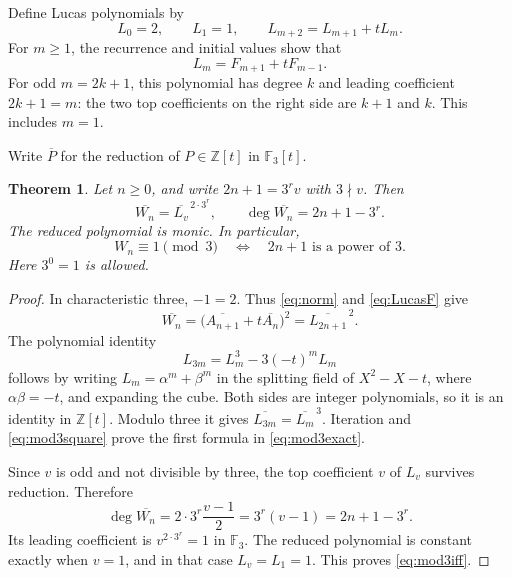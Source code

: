 \documentclass[11pt]{article}
\numberwithin{equation}{section}
\newtheorem{theorem}{Theorem}[section]
\theoremstyle{definition}
\newcommand{\Z}{\mathbb Z}
\newcommand{\F}{\mathbb F}
\begin{document}
Define Lucas polynomials by
\[
 L_0=2,\qquad L_1=1,\qquad L_{m+2}=L_{m+1}+tL_m.
\]
For $m\geq1$, the recurrence and initial values show that
\begin{equation}\label{eq:LucasF}
 L_m=F_{m+1}+tF_{m-1}.
\end{equation}
For odd $m=2k+1$, this polynomial has degree $k$ and leading coefficient
$2k+1=m$: the two top coefficients on the right side are $k+1$ and $k$.
This includes $m=1$.

Write $\overline P$ for the reduction of $P\in\Z[t]$ in $\F_3[t]$.

\begin{theorem}\label{thm:mod3}
Let $n\geq0$, and write $2n+1=3^r v$ with $3\nmid v$.
Then
\begin{equation}\label{eq:mod3exact}
 \overline{W_n}=\overline{L_v}^{\,2\cdot3^r},\qquad
 \deg\overline{W_n}=2n+1-3^r.
\end{equation}
The reduced polynomial is monic.  In particular,
\begin{equation}\label{eq:mod3iff}
 \boxed{\quad W_n\equiv1\pmod3
 \quad\Longleftrightarrow\quad
 2n+1\text{ is a power of }3.\quad}
\end{equation}
Here $3^0=1$ is allowed.
\end{theorem}
\begin{proof}
In characteristic three, $-1=2$.  Thus \eqref{eq:norm} and
\eqref{eq:LucasF} give
\begin{equation}\label{eq:mod3square}
 \overline{W_n}
 =\bigl(\overline{A_{n+1}}+t\overline{A_n}\bigr)^2
 =\overline{L_{2n+1}}^{\,2}.
\end{equation}
The polynomial identity
\begin{equation}\label{eq:LucasFrobenius}
 L_{3m}=L_m^3-3(-t)^mL_m
\end{equation}
follows by writing $L_m=\alpha^m+\beta^m$ in the splitting field of
$X^2-X-t$, where $\alpha\beta=-t$, and expanding the cube.  Both sides
are integer polynomials, so it is an identity in $\Z[t]$.
Modulo three it gives $\overline{L_{3m}}=\overline{L_m}^{\,3}$.
Iteration and \eqref{eq:mod3square} prove the first formula in
\eqref{eq:mod3exact}.

Since $v$ is odd and not divisible by three, the top coefficient $v$
of $L_v$ survives reduction.  Therefore
\[
 \deg\overline{W_n}
 =2\cdot3^r\frac{v-1}{2}=3^r(v-1)=2n+1-3^r.
\]
Its leading coefficient is $v^{2\cdot3^r}=1$ in $\F_3$.
The reduced polynomial is constant exactly when $v=1$, and in that case
$L_v=L_1=1$.  This proves \eqref{eq:mod3iff}.
\end{proof}
\end{document}

